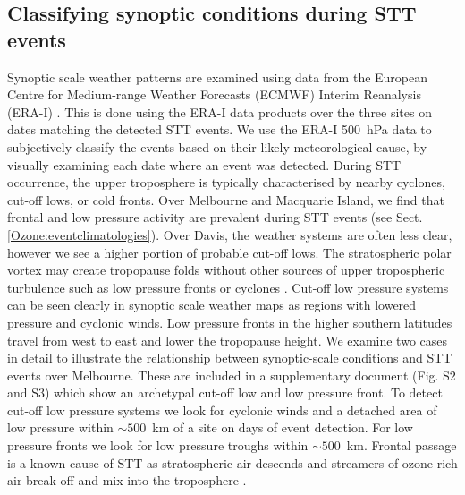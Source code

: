   \subsection{Classifying synoptic conditions during STT events}
    \label{Ozone:WeatherClassifications}
    Synoptic scale weather patterns are examined using data from the European Centre for Medium-range Weather Forecasts (ECMWF) Interim Reanalysis (ERA-I) \citep{Dee2011}.
    This is done using the ERA-I data products over the three sites on dates matching the detected STT events.
    We use the ERA-I 500~hPa data to subjectively classify the events based on their likely meteorological cause, by visually examining each date where an event was detected.
    During STT occurrence, the upper troposphere is typically characterised by nearby cyclones, cut-off lows, or cold fronts.
    Over Melbourne and Macquarie Island, we find that frontal and low pressure activity are prevalent during STT events (see Sect. \ref{Ozone:eventclimatologies}).
    Over Davis, the weather systems are often less clear, however we see a higher portion of probable cut-off lows. 
    The stratospheric polar vortex may create tropopause folds without other sources of upper tropospheric turbulence such as low pressure fronts or cyclones \citep[e.g.][]{Baray2000,Sprenger2003,Tyrlis2014}.
    Cut-off low pressure systems can be seen clearly in synoptic scale weather maps as regions with lowered pressure and cyclonic winds.
    Low pressure fronts in the higher southern latitudes travel from west to east and lower the tropopause height.
    We examine two cases in detail to illustrate the relationship between synoptic-scale conditions and STT events over Melbourne.
    These are included in a supplementary document (Fig. S2 and S3) which show an archetypal cut-off low and low pressure front.
    To detect cut-off low pressure systems we look for cyclonic winds and a detached area of low pressure within $\sim 500$~km of a site on days of event detection.
    For low pressure fronts we look for low pressure troughs within $\sim 500$~km.
    Frontal passage is a known cause of STT as stratospheric air descends and streamers of ozone-rich air break off and mix into the troposphere \citep{Sprenger2003}.



